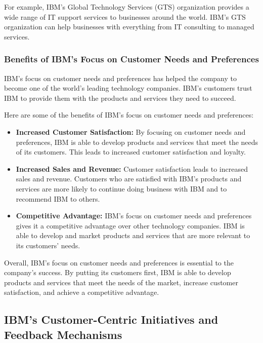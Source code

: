 For example, IBM's Global Technology Services (GTS) organization provides a wide range of IT support services to businesses around the world. IBM's GTS organization can help businesses with everything from IT consulting to managed services.

\subsubsection{Benefits of IBM's Focus on Customer Needs and Preferences}

IBM's focus on customer needs and preferences has helped the company to become one of the world's leading technology companies. IBM's customers trust IBM to provide them with the products and services they need to succeed.

Here are some of the benefits of IBM's focus on customer needs and preferences:

\begin{itemize}
  \item \textbf{Increased Customer Satisfaction:} By focusing on customer needs and preferences, IBM is able to develop products and services that meet the needs of its customers. This leads to increased customer satisfaction and loyalty.
  
  \item \textbf{Increased Sales and Revenue:} Customer satisfaction leads to increased sales and revenue. Customers who are satisfied with IBM's products and services are more likely to continue doing business with IBM and to recommend IBM to others.
  
  \item \textbf{Competitive Advantage:} IBM's focus on customer needs and preferences gives it a competitive advantage over other technology companies. IBM is able to develop and market products and services that are more relevant to its customers' needs.
\end{itemize}

Overall, IBM's focus on customer needs and preferences is essential to the company's success. By putting its customers first, IBM is able to develop products and services that meet the needs of the market, increase customer satisfaction, and achieve a competitive advantage.


\subsection{IBM's Customer-Centric Initiatives and Feedback Mechanisms}

